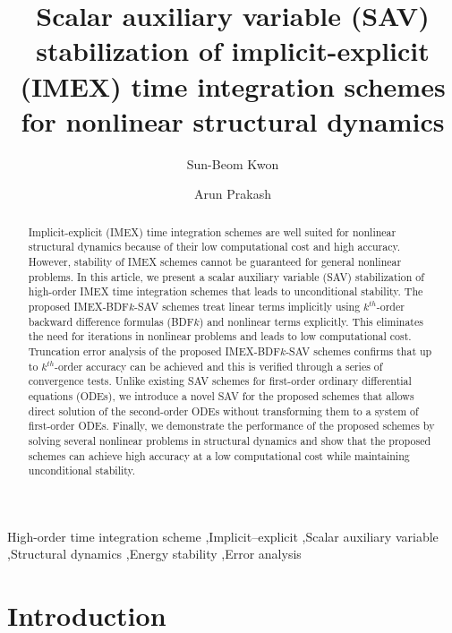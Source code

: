 \documentclass[review]{elsarticle}
\begin{document}
\begin{frontmatter}

\title{
Scalar auxiliary variable (SAV) stabilization of implicit-explicit (IMEX) time integration schemes for nonlinear structural dynamics
}

\author[1]{Sun-Beom Kwon}
\author[1]{Arun Prakash}

\address[1]{Lyles School of Civil Engineering, Purdue University, West Lafayette, IN 47907, USA}

\begin{abstract}
Implicit-explicit (IMEX) time integration schemes are well suited for nonlinear structural dynamics because of their low computational cost and high accuracy. 
However, stability of IMEX schemes cannot be guaranteed for general nonlinear problems. 
In this article, we present a scalar auxiliary variable (SAV) stabilization of high-order IMEX time integration schemes that leads to unconditional stability.
The proposed IMEX-BDF$k$-SAV schemes treat linear terms implicitly using $k^{th}$-order backward difference formulas (BDF$k$) and nonlinear terms explicitly.
This eliminates the need for iterations in nonlinear problems and leads to low computational cost.
Truncation error analysis of the proposed IMEX-BDF$k$-SAV schemes confirms that up to $k^{th}$-order accuracy can be achieved and this is verified through a series of convergence tests.
Unlike existing SAV schemes for first-order ordinary differential equations (ODEs), we introduce a novel SAV for the proposed schemes that allows direct solution of the second-order ODEs without transforming them to a system of first-order ODEs.
Finally, we demonstrate the performance of the proposed schemes by solving several nonlinear problems in structural dynamics and show that the proposed schemes can achieve high accuracy at a low computational cost while maintaining unconditional stability.
\end{abstract}

\begin{keyword}
High-order time integration scheme \sep Implicit--explicit \sep Scalar auxiliary variable \sep Structural dynamics \sep Energy stability \sep Error analysis
\end{keyword}

\end{frontmatter}

\section{Introduction}
\label{sec:4th1}
\end{document}
